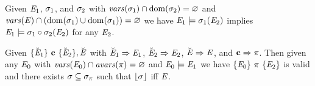 \begin{lemma}
  \label{lemma-hardpacksubn}
  Given $\mathit{E}_1$, $\sigma_1$, and $\sigma_2$ with $\mathit{vars}(\sigma_1) \cap \mathrm{dom}(\sigma_2)= \varnothing$
  and $\mathit{vars}(\mathit{E}) \cap (\mathrm{dom}(\sigma_1) \cup \mathrm{dom}(\sigma_1)) = \varnothing$ we have
  $\mathit{E}_1 \models \sigma_1(\mathit{E}_2)$ implies $\mathit{E}_1 \models \sigma_1 \circ \sigma_2(\mathit{E}_2)$ for
  any $\mathit{E}_2$.
\end{lemma}

\begin{lemma}
  Given $\{ \breve{\mathit{E}}_1 \}\ \mathbf{c}\ \{ \breve{\mathit{E}}_2 \},\breve{\mathit{E}}$ with $\breve{\mathit{E}}_1 \Rightarrow
  \mathit{E}_1$, $\breve{\mathit{E}}_2 \Rightarrow \mathit{E}_2$, $\breve{\mathit{E}} \Rightarrow \mathit{E}$, and $\mathbf{c} \Rightarrow
  \pi$. Then given any $\mathit{E}_0$ with $\mathit{vars}(\mathit{E}_0) \cap
  \mathit{avars}(\pi) = \varnothing$ and $\mathit{E}_0 \models \mathit{E}_1$ we have
  $\{ \mathit{E}_0 \}\ \pi\ \{ \mathit{E}_2 \}$ is valid and there exists $\sigma
  \subseteq \sigma_\pi$ such that $\lfloor \sigma \rfloor$ iff $\mathit{E}$.
\end{lemma}

